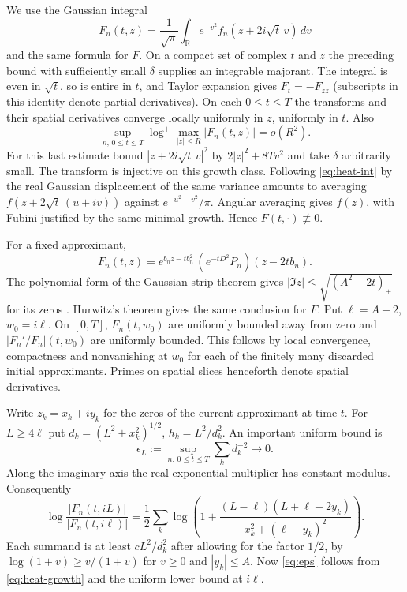 \documentclass[11pt,a4paper]{article}
\numberwithin{equation}{section}
\begin{document}
We use the Gaussian integral
\begin{equation}\label{eq:heat-int}
 F_n(t,z)=\frac1{\sqrt\pi}\int_{\mathbb R}e^{-v^2}
                          f_n(z+2i\sqrt t\,v)\,dv
\end{equation}
and the same formula for $F$. On a compact set of complex $t$ and $z$
the preceding bound with sufficiently small $\delta$ supplies an
integrable majorant. The integral is even in $\sqrt t$, so is entire
in $t$, and Taylor expansion gives $F_t=-F_{zz}$ (subscripts in
this identity denote partial derivatives). On each $0\le t\le T$
the transforms and their spatial derivatives converge locally uniformly
in $z$, uniformly in $t$. Also
\begin{equation}\label{eq:heat-growth}
 \sup_{n,\,0\le t\le T}\log^+\max_{|z|\le R}|F_n(t,z)|=o(R^2).
\end{equation}
For this last estimate bound $|z+2i\sqrt t\,v|^2$ by
$2|z|^2+8T v^2$ and take $\delta$ arbitrarily small.
The transform is injective on this growth class. Following
\eqref{eq:heat-int} by the real Gaussian displacement of the same
variance amounts to averaging $f(z+2\sqrt t\,(u+iv))$ against
$e^{-u^2-v^2}/\pi$. Angular averaging gives $f(z)$, with Fubini
justified by the same minimal growth. Hence $F(t,\cdot)\not\equiv0$.

For a fixed approximant,
\[
 F_n(t,z)=e^{b_n z-tb_n^2}\,(e^{-tD^2}P_n)(z-2tb_n).
\]
The polynomial form of the Gaussian strip theorem gives
$|\Im z|\le\sqrt{(A^2-2t)_+}$ for its zeros \cite{deBruijn,Cardon}.
Hurwitz's theorem gives the same conclusion for $F$. Put
$\ell=A+2$, $w_0=i\ell$. On $[0,T]$, $F_n(t,w_0)$ are uniformly
bounded away from zero and $|F_n'/F_n|(t,w_0)$ are uniformly bounded.
This follows by local convergence, compactness and nonvanishing at
$w_0$ for each of the finitely many discarded initial approximants.
Primes on spatial slices henceforth denote spatial derivatives.

Write $z_k=x_k+i y_k$ for the zeros of the current approximant at
time $t$. For $L\ge4\ell$ put $d_k=(L^2+x_k^2)^{1/2}$,
$h_k=L^2/d_k^2$. An important uniform bound is
\begin{equation}\label{eq:eps}
   \epsilon_L:=\sup_{n,\,0\le t\le T}\sum_k d_k^{-2}\longrightarrow0 .
\end{equation}
Along the imaginary axis the real exponential multiplier has constant modulus.
Consequently
\[
 \log\frac{|F_n(t,iL)|}{|F_n(t,i\ell)|}
 =\frac12\sum_k\log\left(1+
   \frac{(L-\ell)(L+\ell-2y_k)}{x_k^2+(\ell-y_k)^2}\right).
\]
Each summand is at least $cL^2/d_k^2$ after allowing for the factor
$1/2$, by $\log(1+v)\ge v/(1+v)$ for $v\ge0$ and $|y_k|\le A$.
Now \eqref{eq:eps} follows from \eqref{eq:heat-growth} and the
uniform lower bound at $i\ell$.
\end{document}
